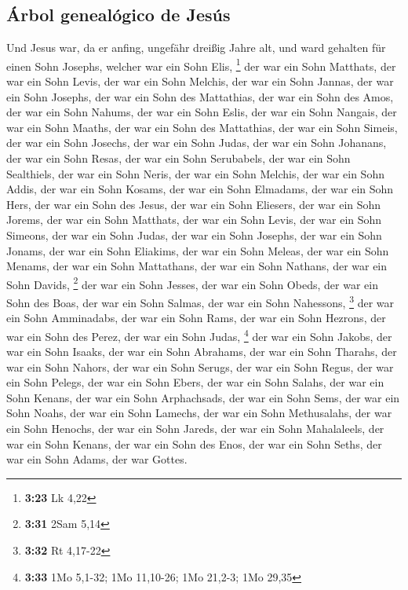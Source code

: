 \hypertarget{uxe1rbol-genealuxf3gico-de-jesuxfas}{%
\subsection{Árbol genealógico de
Jesús}\label{uxe1rbol-genealuxf3gico-de-jesuxfas}}

 Und Jesus war, da er anfing, ungefähr dreißig Jahre alt,
und ward gehalten für einen Sohn Josephs, welcher war ein Sohn Elis,
\footnote{\textbf{3:23} Lk 4,22}  der war ein Sohn
Matthats, der war ein Sohn Levis, der war ein Sohn Melchis, der war ein
Sohn Jannas, der war ein Sohn Josephs,  der war ein Sohn
des Mattathias, der war ein Sohn des Amos, der war ein Sohn Nahums, der
war ein Sohn Eslis, der war ein Sohn Nangais,  der war
ein Sohn Maaths, der war ein Sohn des Mattathias, der war ein Sohn
Simeis, der war ein Sohn Josechs, der war ein Sohn Judas,
 der war ein Sohn Johanans, der war ein Sohn Resas, der
war ein Sohn Serubabels, der war ein Sohn Sealthiels, der war ein Sohn
Neris,  der war ein Sohn Melchis, der war ein Sohn Addis,
der war ein Sohn Kosams, der war ein Sohn Elmadams, der war ein Sohn
Hers,  der war ein Sohn des Jesus, der war ein Sohn
Eliesers, der war ein Sohn Jorems, der war ein Sohn Matthats, der war
ein Sohn Levis,  der war ein Sohn Simeons, der war ein
Sohn Judas, der war ein Sohn Josephs, der war ein Sohn Jonams, der war
ein Sohn Eliakims,  der war ein Sohn Meleas, der war ein
Sohn Menams, der war ein Sohn Mattathans, der war ein Sohn Nathans, der
war ein Sohn Davids, \footnote{\textbf{3:31} 2Sam 5,14} 
der war ein Sohn Jesses, der war ein Sohn Obeds, der war ein Sohn des
Boas, der war ein Sohn Salmas, der war ein Sohn Nahessons, \footnote{\textbf{3:32}
  Rt 4,17-22}  der war ein Sohn Amminadabs, der war ein
Sohn Rams, der war ein Sohn Hezrons, der war ein Sohn des Perez, der war
ein Sohn Judas, \footnote{\textbf{3:33} 1Mo 5,1-32; 1Mo 11,10-26; 1Mo
  21,2-3; 1Mo 29,35}  der war ein Sohn Jakobs, der war
ein Sohn Isaaks, der war ein Sohn Abrahams, der war ein Sohn Tharahs,
der war ein Sohn Nahors,  der war ein Sohn Serugs, der
war ein Sohn Regus, der war ein Sohn Pelegs, der war ein Sohn Ebers, der
war ein Sohn Salahs,  der war ein Sohn Kenans, der war
ein Sohn Arphachsads, der war ein Sohn Sems, der war ein Sohn Noahs, der
war ein Sohn Lamechs,  der war ein Sohn Methusalahs, der
war ein Sohn Henochs, der war ein Sohn Jareds, der war ein Sohn
Mahalaleels, der war ein Sohn Kenans,  der war ein Sohn
des Enos, der war ein Sohn Seths, der war ein Sohn Adams, der war
Gottes.

